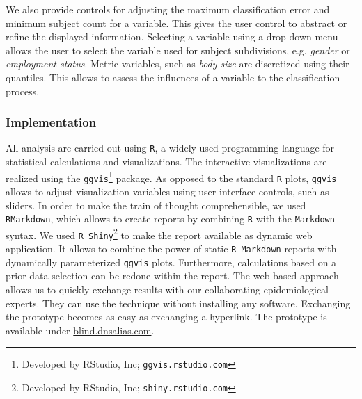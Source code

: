 \documentclass[a4paper,twoside]{style/article}
\begin{document}
We also provide controls for adjusting the maximum classification error and minimum subject count for a variable.
This gives the user control to abstract or refine the displayed information.
Selecting a variable using a drop down menu allows the user to select the variable used for subject subdivisions, e.g. \emph{gender} or \emph{employment status}.
Metric variables, such as \emph{body size} are discretized using their quantiles.
This allows to assess the influences of a variable to the classification process.
\subsubsection{Implementation}
All analysis are carried out using \texttt{R}, a widely used programming language for statistical calculations and visualizations.
The interactive visualizations are realized using the \texttt{ggvis}\footnote{Developed by RStudio, Inc; \texttt{ggvis.rstudio.com}} package.
As opposed to the standard \texttt{R} plots, \texttt{ggvis} allows to adjust visualization variables using user interface controls, such as sliders.
In order to make the train of thought comprehensible, we used \texttt{RMarkdown}, which allows to create reports by combining \texttt{R} with the \texttt{Markdown} syntax.
We used \texttt{R Shiny}\footnote{Developed by RStudio, Inc; \texttt{shiny.rstudio.com}} to make the report available as dynamic web application.
It allows to combine the power of static \texttt{R Markdown} reports with dynamically parameterized \texttt{ggvis} plots.
Furthermore, calculations based on a prior data selection can be redone within the report.
The web-based approach allows us to quickly exchange results with our collaborating epidemiological experts.
They can use the technique without installing any software.
Exchanging the prototype becomes as easy as exchanging a hyperlink.
The prototype is available under \url{blind.dnsalias.com}.
\end{document}
